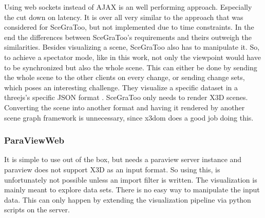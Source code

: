 Using web sockets instead of AJAX is an well performing approach.
\cite{Marion:2012:RCS:2338714.2338721} Especially the cut down on latency. It is
over all very similar to the approach that was considered for SceGraToo, but not
implemented due to time constraints. In the end the differences between
SceGraToo's requirements and theirs outweigh the similarities. Besides visualizing a scene,
\gls{SceGraToo} also has to manipulate it. So, to achieve a spectator mode,
like in this work, not only the viewpoint would have to be synchronized but also
the whole scene. This can either be done by sending the whole scene to the other
clients on every change, or sending change sets, which poses an interesting
challenge. They visualize a specific dataset in a threejs's specific \gls{JSON} format
\cite{threejs-format}. \gls{SceGraToo} only needs to render \gls{X3D} scenes. Converting the
scene into another format and having it rendered by another scene graph framework
is unnecessary, since x3dom does a good job doing this.

\subsubsection{ParaViewWeb}
\label{paraviewweb-pvweb}

It is simple to use out of the box, but needs a paraview server instance and
paraview does not support \gls{X3D} as an input format. So using this, is unfortunately
not possible unless an import filter is written. The visualization is
mainly meant to explore data sets. There is no easy way to manipulate
the input data. This can only happen by extending the visualization
pipeline via python scripts on the server.
